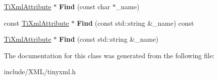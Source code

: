 \begin{DoxyCompactItemize}
\item 
\hypertarget{class_ti_xml_attribute_set_a2f210bed54c832adf1683c44c35727b9}{
\hyperlink{class_ti_xml_attribute}{TiXmlAttribute} $\ast$ {\bfseries Find} (const char $\ast$\_\-name)}
\label{class_ti_xml_attribute_set_a2f210bed54c832adf1683c44c35727b9}

\item 
\hypertarget{class_ti_xml_attribute_set_a1494d1e6738c594a501c1319860dd43c}{
const \hyperlink{class_ti_xml_attribute}{TiXmlAttribute} $\ast$ {\bfseries Find} (const std::string \&\_\-name) const }
\label{class_ti_xml_attribute_set_a1494d1e6738c594a501c1319860dd43c}

\item 
\hypertarget{class_ti_xml_attribute_set_ab154233f8ecffc0ee0c77a045fa9e69b}{
\hyperlink{class_ti_xml_attribute}{TiXmlAttribute} $\ast$ {\bfseries Find} (const std::string \&\_\-name)}
\label{class_ti_xml_attribute_set_ab154233f8ecffc0ee0c77a045fa9e69b}

\end{DoxyCompactItemize}


The documentation for this class was generated from the following file:\begin{DoxyCompactItemize}
\item 
include/XML/tinyxml.h\end{DoxyCompactItemize}
